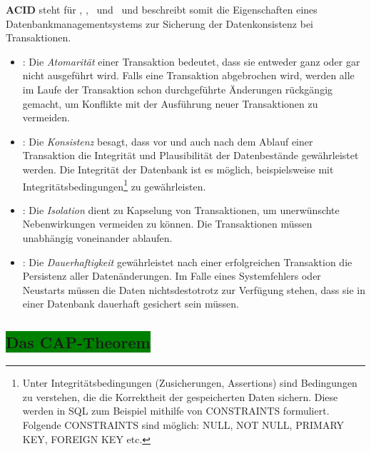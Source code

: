 \textbf{ACID} steht für \Acid, \aCid, \acId\ und \aciD\ und beschreibt somit die Eigenschaften eines Datenbankmanagementsystems zur Sicherung der Datenkonsistenz bei Transaktionen.
\begin{itemize}

\item \Acid: Die \textit{Atomarität} einer Transaktion bedeutet, dass sie entweder ganz oder gar nicht ausgeführt wird. Falls eine Transaktion abgebrochen wird, werden alle im Laufe der Transaktion schon durchgeführte Änderungen rückgängig gemacht, um Konflikte mit der Ausführung neuer Transaktionen zu vermeiden.%
\item \aCid: Die \textit{Konsistenz} besagt, dass vor und auch nach dem Ablauf einer Transaktion die Integrität und Plausibilität der Datenbestände gewährleistet werden. Die Integrität der Datenbank ist es möglich, beispielsweise mit Integritätsbedingungen\footnote{Unter Integritätsbedingungen (Zusicherungen, Assertions) sind Bedingungen zu verstehen, die die Korrektheit der gespeicherten Daten sichern. Diese werden in SQL zum Beispiel mithilfe von CONSTRAINTS formuliert. Folgende CONSTRAINTS sind möglich: NULL, NOT NULL, PRIMARY KEY, FOREIGN KEY etc.} zu gewährleisten. 
\item \acId: Die \textit{Isolation} dient zu Kapselung von Transaktionen, um unerwünschte Nebenwirkungen vermeiden zu können. Die Transaktionen müssen unabhängig voneinander ablaufen.
\item \aciD: Die \textit{Dauerhaftigkeit} gewährleistet nach einer erfolgreichen Transaktion die Persistenz aller Datenänderungen. Im Falle eines Systemfehlers oder Neustarts müssen die Daten nichtsdestotrotz zur Verfügung stehen, dass sie in einer Datenbank dauerhaft gesichert sein müssen.
\end{itemize}

\subsection{\colorbox{green}{Das CAP-Theorem}}\label{cap}

